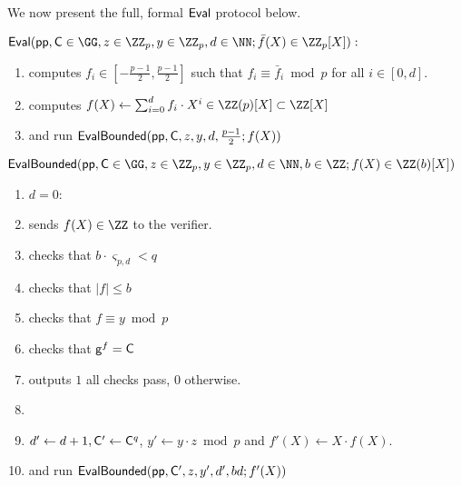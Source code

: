  We now present the full, formal $\textsf{{Eval}}$ protocol below.
\begin{small}
\begin{mdframed}
\begin{minipage}{\textwidth}
			$\pro{Eval}(\crs, \gr{C}\in \GG, z\in \ZZ_p, y\in \ZZ_p, d \in \NN; \bar{f}(X)\in \ZZ_p[X]) :$ 
			\begin{enumerate}[nolistsep]
			\item \prover computes $f_i \in [-\frac{p-1}{2},\frac{p-1}{2}]$ such that $f_i\equiv \bar{f}_i\bmod p$ for all $i\in[0,d]$.
			\item \prover computes $f(X)\gets \sum_{i=0}^d f_i \cdot X^{i}\in \ZZ(p)[X]\subset \ZZ[X]$
			\item \prover and \verifier run $\textsf{{EvalBounded}}(\textsf{pp},\mathsf{C},z,y,d,\frac{p-1}{2};f(X))$
		    \end{enumerate}
		    		\vspace{1em}
		$\pro{EvalBounded}(\crs,\gr{C}\in \GG,z\in \ZZ_p,y\in \ZZ_p,d\in \NN,b\in \ZZ;f(X)\in \ZZ(b)[X])$		
	    \begin{enumerate}[nolistsep]
        \item \pcif $d=0$:
        \item \label{line:basestart}\pcind[1] \prover sends $f(X)\in \ZZ$ to the verifier. 
        \item \pcind[1] \verifier checks that $b\cdot \boldsymbol{\varsigma}_{p,d} < q$
        \item \pcind[1] \verifier checks that $|f|\leq b$
          \item \pcind[1] \verifier checks that $f\equiv y \bmod p$
                \item \label{line:baseend}\pcind[1] \verifier checks that $\mathsf{g}^{f}=\mathsf{C}$
\item \pcind[1] \verifier outputs $1$ \pcif all checks pass, $0$ otherwise.
          \item {}
         \item \pcind[1]  $d'\gets d+1, \mathsf{C}'\gets \mathsf{C}^q$, $y'\gets y\cdot z \bmod p$ and $f'(X)\gets X \cdot f(X)$.
         \item \pcind[1] \prover and \verifier run $\textsf{{EvalBounded}}(\textsf{pp},\mathsf{C}',z,y',d',bd;f'(X))$


\end{enumerate}
\end{minipage}
\end{mdframed}
\end{small}
